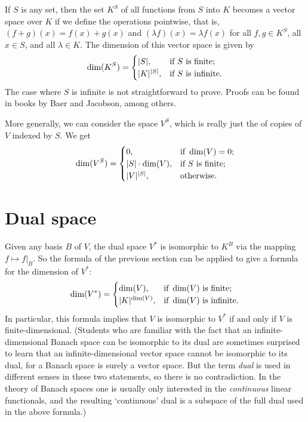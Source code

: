 \documentclass[12pt]{article}
\begin{document}
If $S$ is any set,
then the set $K^S$ of all functions from $S$ into $K$
becomes a vector space over $K$ if we define the operations pointwise,
that is, $(f+g)(x)=f(x)+g(x)$ and $(\lambda f)(x)=\lambda f(x)$
for all $f,g\in K^S$, all $x\in S$, and all $\lambda\in K$.
The dimension of this vector space is given by
\[
  \dim(K^S)=\begin{cases}
               |S|,&\hbox{if }S\hbox{ is finite};\\
               |K|^{|S|},&\hbox{if }S\hbox{ is infinite}.
            \end{cases}
\]
The case where $S$ is infinite is not straightforward to prove.
Proofs can be found in books by Baer\cite{baer} and Jacobson\cite{jacobson},
among others.

More generally, we can consider the space $V^S$,
which is really just the  of copies of $V$ indexed by $S$.
We get
\[
  \dim(V^S)=\begin{cases}
               0,&\hbox{if }\dim(V)=0;\\
               |S|\cdot\dim(V),&\hbox{if }S\hbox{ is finite};\\
               |V|^{|S|},&\hbox{otherwise}.
            \end{cases}
\]

\section*{Dual space}

Given any basis $B$ of $V$,
the dual space $V^*$
is isomorphic to $K^B$ via the mapping $f\mapsto f|_B$.
So the formula of the previous section
can be applied to give a formula for the dimension of $V^*$:
\[
  \dim(V^*)=\begin{cases}
               \dim(V),&\hbox{if }\dim(V)\hbox{ is finite};\\
               |K|^{\dim(V)},&\hbox{if }\dim(V)\hbox{ is infinite}.
            \end{cases}
\]
In particular, this formula implies that $V$ is isomorphic to $V^*$
if and only if $V$ is finite-dimensional.
(Students who are familiar with the fact that
an infinite-dimensional Banach space can be isomorphic to its dual
are sometimes surprised to learn that an infinite-dimensional vector space
cannot be isomorphic to its dual,
for a Banach space is surely a vector space.
But the term {\it dual} is used in different senses in these two statements,
so there is no contradiction.
In the theory of Banach spaces
one is usually only interested in the {\it continuous} linear functionals,
and the resulting `continuous' dual
is a subspace of the full dual used in the above formula.)
\end{document}
